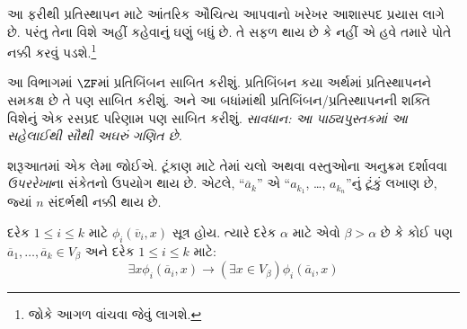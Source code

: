આ ફરીથી પ્રતિસ્થાપન માટે આંતરિક ઔચિત્ય આપવાનો
ખરેખર આશાસ્પદ પ્રયાસ લાગે છે. પરંતુ તેના વિશે અહીં
કહેવાનું ઘણું બધું છે. તે સફળ થાય છે કે નહીં એ હવે
તમારે પોતે નક્કી કરવું પડશે.\footnote{જોકે આગળ
\citet[95--100]{Incurvati2020} વાંચવા જેવું લાગશે.}
\endgroup

\begingroup
\makeatletter{}\makeatother

\label{guunit:OLP-0572}


આ વિભાગમાં $\ZF$માં પ્રતિબિંબન સાબિત કરીશું. પ્રતિબિંબન
કયા અર્થમાં પ્રતિસ્થાપનને સમકક્ષ છે તે પણ સાબિત કરીશું.
અને આ બધાંમાંથી પ્રતિબિંબન/પ્રતિસ્થાપનની શક્તિ વિશેનું
એક રસપ્રદ પરિણામ પણ સાબિત કરીશું. \emph{સાવધાન:
આ પાઠ્યપુસ્તકમાં આ સહેલાઈથી સૌથી અઘરું ગણિત છે.}

શરૂઆતમાં એક લેમા જોઈએ. ટૂંકાણ માટે તેમાં ચલો અથવા
વસ્તુઓના અનુક્રમ દર્શાવવા \emph{ઉપરરેખા}ના સંકેતનો
ઉપયોગ થાય છે. એટલે, ``$\overline{a}_k$'' એ
``$a_{k_1}$, \dots, $a_{k_n}$''નું ટૂંકું લખાણ છે,
જ્યાં $n$ સંદર્ભથી નક્કી થાય છે.

\begin{lem}
દરેક $1 \leq i \leq k$ માટે
$\phi_i(\overline{v}_i, x)$ સૂત્ર હોય. ત્યારે દરેક
$\alpha$ માટે એવો $\beta > \alpha$ છે કે કોઈ પણ
$\overline{a}_1, \ldots, \overline{a}_k \in V_\beta$
અને દરેક $1 \leq i \leq k$ માટે:
\[
	\exists x\phi_i(\overline{a}_i, x) \rightarrow (\exists x \in V_\beta) \phi_i(\overline{a}_i, x)
\]
\end{lem}

